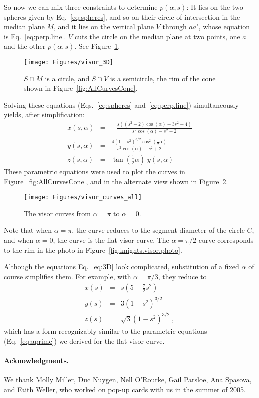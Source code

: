 \pdfoutput=1  \documentclass[]{article}
\newcommand{\eqnlab}[1]{\label{eq:#1}}
\newcommand{\figlab}[1]{\label{fig:#1}}
\newcommand{\eqnref}[1]{\ref{eq:#1}}
\newcommand{\figref}[1]{\ref{fig:#1}}
\def\a{{\alpha}}
\begin{document}
So now we can mix three constraints to determine $p(\a,s)$:
It lies on the two spheres given by Eq.~\eqnref{spheres},
and so on their circle of intersection in the median plane $M$,
and it lies on the vertical plane $V$ through $a a'$, whose equation is Eq.~\eqnref{perp.line}.
$V$ cuts the circle on the median plane at two points, one $a$ and the other $p(\a,s)$.
See Figure~\figref{visor.3D}.
\begin{figure}[htbp]
\centering
\texttt{[image: Figures/visor\_3D]}
\caption{$S \cap M$ is a circle, and $S \cap V$ is a semicircle, the rim of the cone shown in Figure~\protect\figref{AllCurvesCone}.}
\figlab{visor.3D}
\end{figure}



Solving these equations (Eqs.~\eqnref{spheres} and~\eqnref{perp.line}) simultaneously yields,
after simplification:
\begin{eqnarray*}
x(s,\a) &=&
-\frac{s
   \left(\left(s^2-2\right)
   \cos (\alpha )+3
   s^2-4\right)}{s^2 \cos
   (\alpha )-s^2+2} \nonumber \\
 y(s,\a) &=&
   \frac{4
   \left(1-s^2\right)^{3/2}
   \cos ^2\left( \tfrac{1}{2} \a \right)}{s^2 \cos
   (\alpha )-s^2+2} \eqnlab{3D} \\
 z(s,\a) &=&
   \tan \left( \tfrac{1}{2} \a \right) \;
   y(s,\a) \nonumber \;
\end{eqnarray*}
These parametric equations were used to plot
the curves in Figure~\figref{AllCurvesCone},
and in the alternate view shown in Figure~\figref{visor.curves.all}.
\begin{figure}[htbp]
\centering
\texttt{[image: Figures/visor\_curves\_all]}
\caption{The visor curves from $\a=\pi$ to $\a=0$.}
\figlab{visor.curves.all}
\end{figure}
Note that when $\a=\pi$, the curve reduces to the segment diameter of the circle $C$, and when $\a=0$,
the curve is the flat visor curve.
The $\a=\pi/2$ curve corresponds to the rim in the photo in Figure~\figref{knights.visor.photo}.





Although the equations Eq.~\eqnref{3D} look complicated, substitution of a fixed $\a$
of course simplifies them.
For example, with $\a=\pi/3$, they reduce to
\begin{eqnarray*}
x(s) &=&
s ( 5 -\tfrac{7}{2} s^2 ) \\
y(s) &=&
  3 (1-s^2)^{3/2} \\
z(s) &=&
   \sqrt{3}
   (1-s^2 )^{3/2} \;,
\end{eqnarray*}
which has a form recognizably similar to the parametric equations (Eq.~\eqnref{aprime}) we derived for the
flat visor curve.
















\paragraph{Acknowledgments.}\label{Ack}
We thank
Molly Miller,
Duc Nuygen,
Nell O'Rourke,
Gail Parsloe,
Ana Spasova, and
Faith Weller,
who worked on pop-up cards with us in the summer of 2005.






\end{document}

